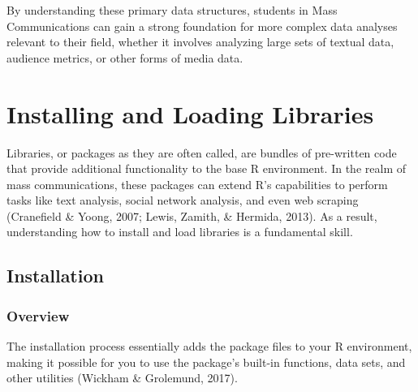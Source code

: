 \documentclass[
]{book}
\newenvironment{Shaded}{\begin{snugshade}}{\end{snugshade}}
\newcommand{\CommentTok}[1]{\textcolor[rgb]{0.56,0.35,0.01}{\textit{#1}}}
\newcommand{\NormalTok}[1]{#1}
\newcommand{\OtherTok}[1]{\textcolor[rgb]{0.56,0.35,0.01}{#1}}
\newcommand{\SpecialCharTok}[1]{\textcolor[rgb]{0.81,0.36,0.00}{\textbf{#1}}}
\newcommand{\StringTok}[1]{\textcolor[rgb]{0.31,0.60,0.02}{#1}}
\begin{document}
\begin{Shaded}
\end{Shaded}

By understanding these primary data structures, students in Mass Communications can gain a strong foundation for more complex data analyses relevant to their field, whether it involves analyzing large sets of textual data, audience metrics, or other forms of media data.

\hypertarget{installing-and-loading-libraries}{%
\section{Installing and Loading Libraries}\label{installing-and-loading-libraries}}

Libraries, or packages as they are often called, are bundles of pre-written code that provide additional functionality to the base R environment. In the realm of mass communications, these packages can extend R's capabilities to perform tasks like text analysis, social network analysis, and even web scraping (Cranefield \& Yoong, 2007; Lewis, Zamith, \& Hermida, 2013). As a result, understanding how to install and load libraries is a fundamental skill.

\hypertarget{installation}{%
\subsection*{Installation}\label{installation}}

\hypertarget{overview-6}{%
\subsubsection*{Overview}\label{overview-6}}

The installation process essentially adds the package files to your R environment, making it possible for you to use the package's built-in functions, data sets, and other utilities (Wickham \& Grolemund, 2017).
\end{document}
